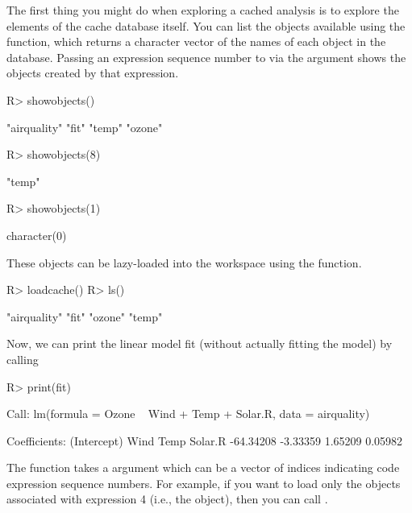\documentclass[nojss]{jss}
\begin{document}
The first thing you might do when exploring a cached analysis is to
explore the elements of the cache database itself.  You can list the
objects available using the  function, which returns
a character vector of the names of each object in the database.
Passing an expression sequence number to  via the
 argument shows the objects created by that expression.
\begin{Schunk}
\begin{Sinput}
R> showobjects()
\end{Sinput}
\begin{Soutput}
[1] "airquality" "fit"        "temp"       "ozone"     
\end{Soutput}
\begin{Sinput}
R> showobjects(8)
\end{Sinput}
\begin{Soutput}
[1] "temp"
\end{Soutput}
\begin{Sinput}
R> showobjects(1)
\end{Sinput}
\begin{Soutput}
character(0)
\end{Soutput}
\end{Schunk}
These objects can be lazy-loaded into the workspace using the
 function.
\begin{Schunk}
\begin{Sinput}
R> loadcache()
R> ls()
\end{Sinput}
\begin{Soutput}
[1] "airquality" "fit"        "ozone"      "temp"      
\end{Soutput}
\end{Schunk}
Now, we can print the linear model fit (without actually fitting the
model) by calling
\begin{Schunk}
\begin{Sinput}
R> print(fit)
\end{Sinput}
\begin{Soutput}
Call:
lm(formula = Ozone ~ Wind + Temp + Solar.R, data = airquality)

Coefficients:
(Intercept)         Wind         Temp      Solar.R  
  -64.34208     -3.33359      1.65209      0.05982  
\end{Soutput}
\end{Schunk}
The  function takes a  argument which can be
a vector of indices indicating code expression sequence numbers.  For
example, if you want to load only the objects associated with
expression 4 (i.e., the  object), then you can call
.
\end{document}
